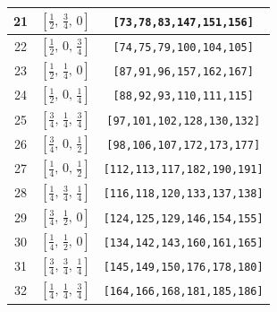 \documentclass[fleqn,8pt]{jsarticle}
\begin{document}
\begin{longtable}{ccc}
21 & $\left[ \frac{1}{2},\, \frac{3}{4},\, 0 \right]$ & {\tt [73,78,83,147,151,156]} \\ \hline
22 & $\left[ \frac{1}{2},\, 0,\, \frac{3}{4} \right]$ & {\tt [74,75,79,100,104,105]} \\ \hline
23 & $\left[ \frac{1}{2},\, \frac{1}{4},\, 0 \right]$ & {\tt [87,91,96,157,162,167]} \\ \hline
24 & $\left[ \frac{1}{2},\, 0,\, \frac{1}{4} \right]$ & {\tt [88,92,93,110,111,115]} \\ \hline
25 & $\left[ \frac{3}{4},\, \frac{1}{4},\, \frac{3}{4} \right]$ & {\tt [97,101,102,128,130,132]} \\ \hline
26 & $\left[ \frac{3}{4},\, 0,\, \frac{1}{2} \right]$ & {\tt [98,106,107,172,173,177]} \\ \hline
27 & $\left[ \frac{1}{4},\, 0,\, \frac{1}{2} \right]$ & {\tt [112,113,117,182,190,191]} \\ \hline
28 & $\left[ \frac{1}{4},\, \frac{3}{4},\, \frac{1}{4} \right]$ & {\tt [116,118,120,133,137,138]} \\ \hline
29 & $\left[ \frac{3}{4},\, \frac{1}{2},\, 0 \right]$ & {\tt [124,125,129,146,154,155]} \\ \hline
30 & $\left[ \frac{1}{4},\, \frac{1}{2},\, 0 \right]$ & {\tt [134,142,143,160,161,165]} \\ \hline
31 & $\left[ \frac{3}{4},\, \frac{3}{4},\, \frac{1}{4} \right]$ & {\tt [145,149,150,176,178,180]} \\ \hline
32 & $\left[ \frac{1}{4},\, \frac{1}{4},\, \frac{3}{4} \right]$ & {\tt [164,166,168,181,185,186]} \\
\end{longtable}
\renewcommand{\arraystretch}{1.2}
\end{document}
